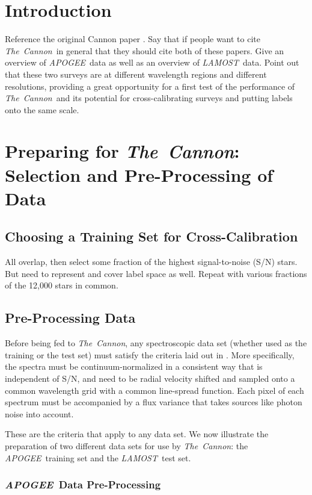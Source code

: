 \documentclass[12pt, preprint]{aastex}
\newcommand{\tc}{\textsl{The~Cannon}}
\newcommand{\apogee}{\textsl{APOGEE}}
\newcommand{\lamost}{\textsl{LAMOST}}
\begin{document}
\section{Introduction}

Reference the original Cannon paper \citep{ness2015}. Say that if people want
to cite \tc\ in general that they should cite both of these papers. Give an 
overview of \apogee\ data as well as an overview of \lamost\ data. Point out
that these two surveys are at different wavelength regions and different 
resolutions, providing a great opportunity for a first test of the performance
of \tc\ and its potential for cross-calibrating surveys and putting labels
onto the same scale.

\section{Preparing for \tc: Selection and Pre-Processing of Data}

\subsection{Choosing a Training Set for Cross-Calibration}

All overlap, then select some fraction of the highest signal-to-noise (S/N) 
stars. But need to represent and cover label space as well. Repeat with 
various fractions of the 12,000 stars in common.

\subsection{Pre-Processing Data}

Before being fed to \tc, any spectroscopic data set (whether used as the 
training or the test set) must satisfy the criteria laid out in 
\citep{ness2015}. More specifically, the spectra must be
continuum-normalized in a consistent way that is independent of S/N, and need
to be radial velocity shifted and sampled onto a common wavelength grid with
a common line-spread function. Each pixel of each spectrum must be accompanied
by a flux variance that takes sources like photon noise into account. 

These are the criteria that apply to any data set. We now illustrate the 
preparation of two different data sets for use by \tc: the \apogee\ training
set and the \lamost\ test set. 

\subsubsection{\apogee\ Data Pre-Processing}
\end{document}
